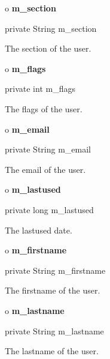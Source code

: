 o {\bf m\_section} 

\begin{PRE}
 private String m\_section
\end{PRE}

\begin{description}
\htmlDD The section of the user.

\end{description}

o {\bf m\_flags} 

\begin{PRE}
 private int m\_flags
\end{PRE}

\begin{description}
\htmlDD The flags of the user.

\end{description}

o {\bf m\_email} 

\begin{PRE}
 private String m\_email
\end{PRE}

\begin{description}
\htmlDD The email of the user.

\end{description}

o {\bf m\_lastused} 

\begin{PRE}
 private long m\_lastused
\end{PRE}

\begin{description}
\htmlDD The lastused date.

\end{description}

o {\bf m\_firstname} 

\begin{PRE}
 private String m\_firstname
\end{PRE}

\begin{description}
\htmlDD The firstname of the user.

\end{description}

o {\bf m\_lastname} 

\begin{PRE}
 private String m\_lastname
\end{PRE}

\begin{description}
\htmlDD The lastname of the user.

\end{description}

